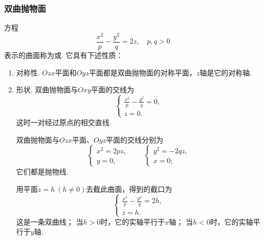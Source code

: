 \subsubsection{双曲抛物面}
方程\begin{equation}\label{equation:解析几何.双曲抛物面的一般方程}
	\frac{x^2}{p}-\frac{y^2}{q}=2z,
	\quad p,q>0
\end{equation}
表示的曲面称为或.
它具有下述性质：
\begin{enumerate}
	\item 对称性.
	\(Ozx\)平面和\(Oyz\)平面都是双曲抛物面的对称平面，\(z\)轴是它的对称轴.

	\item 形状.
	双曲抛物面与\(Oxy\)平面的交线为\[
		\left\{ \begin{array}{l}
			\frac{x^2}{p} - \frac{y^2}{q} = 0, \\
			z = 0.
		\end{array} \right.
	\]
	这时一对经过原点的相交直线.

	双曲抛物面与\(Ozx\)平面、\(Oyz\)平面的交线分别为\[
		\left\{ \begin{array}{l}
			x^2 = 2pz, \\
			y = 0,
		\end{array} \right.
		\qquad
		\left\{ \begin{array}{l}
			y^2 = -2qz, \\
			x = 0;
		\end{array} \right.
	\]
	它们都是抛物线.

	用平面\(z=h\ (h\neq0)\)去截此曲面，得到的截口为\[
		\left\{ \begin{array}{l}
			\frac{x^2}{p} - \frac{y^2}{q} = 2h, \\
			z = h.
		\end{array} \right.
	\]
	这是一条双曲线；
	当\(h>0\)时，它的实轴平行于\(x\)轴；
	当\(h<0\)时，它的实轴平行于\(y\)轴.


\end{enumerate}
